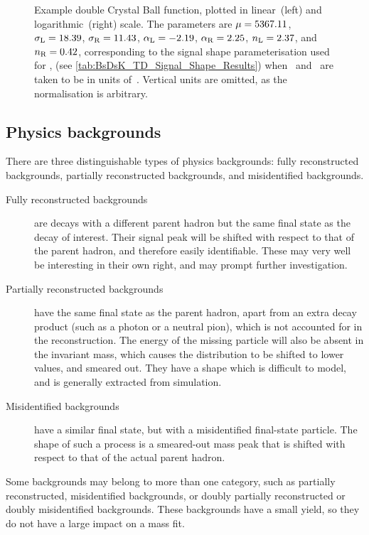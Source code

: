 \begin{figure}[htb]
\begin{subfigure}{.48\textwidth}
    \end{subfigure}
    \caption{
        Example double Crystal Ball function, plotted in linear~(left) and logarithmic~(right) scale.
        The parameters are \({\mu = \num{5367.11}}\), \({\sigma_{\text{L}} = \num{18.39}}\), \({\sigma_{\text{R}} = \num{11.43}}\), \({\alpha_{\text{L}} = \num{-2.19}}\), \({\alpha_{\text{R}} = \num{2.25}}\), \({n_{\text{L}} = \num{2.37}}\), and \({n_{\text{R}} = \num{0.42}}\), corresponding to the signal shape parameterisation used for \BsDsK, \DsmpPhiPi (see \cref{tab:BsDsK_TD_Signal_Shape_Results}) when \DCBmu~and \DCBsLR~are taken to be in units of~\si{\MeVcc}.
        Vertical units are omitted, as the normalisation is arbitrary.}
    \label{fig:Methods_DCB_Examples}
\end{figure}

\subsection{Physics backgrounds}
There are three distinguishable types of physics backgrounds: fully reconstructed backgrounds, partially reconstructed backgrounds, and misidentified backgrounds.
\begin{description}
\item[Fully reconstructed backgrounds] are decays with a different parent hadron but the same final state as the decay of interest.
    Their signal peak will be shifted with respect to that of the parent hadron, and therefore easily identifiable. These may very well be interesting in their own right, and may prompt further investigation.
\item[Partially reconstructed backgrounds] have the same final state as the parent hadron, apart from an extra decay product (such as a photon or a neutral pion), which is not accounted for in the reconstruction.
    The energy of the missing particle will also be absent in the invariant mass, which causes the distribution to be shifted to lower values, and smeared out. They have a shape which is difficult to model, and is generally extracted from simulation.
\item[Misidentified backgrounds] have a similar final state, but with a misidentified final-state particle.
    The shape of such a process is a smeared-out mass peak that is shifted with respect to that of the actual parent hadron.
\end{description}

Some backgrounds may belong to more than one category, such as partially reconstructed, misidentified backgrounds, or doubly partially reconstructed or doubly misidentified backgrounds.
These backgrounds have a small yield, so they do not have a large impact on a mass fit.

